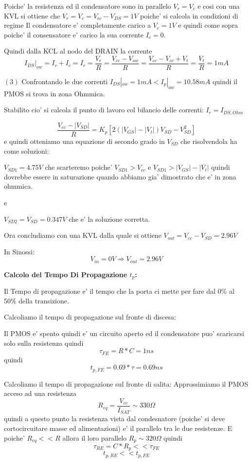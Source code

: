 \documentclass[\main/main.tex]{subfiles}
\begin{document}
Poiche' la resistenza ed il condensatore sono in parallelo $V_r = V_c$ e cosi con una KVL si ottiene che $V_r = V_c = V_{cc} - V_{DS} = 1V$ poiche' si calcola in condizioni di regime Il condensatore e' completamente carico a $V_c = 1V$  e quindi come sopra poiche' il consensatore e' carico la sua corrente $I_c = 0$.

Quindi dalla KCL al nodo del DRAIN la corrente \[I_{DS}|_{ow} = I_r + I_c = I_r = \frac{V_r}{R}= \frac{ V_{cc} - V_{ow}}{R} =  \frac{ V_{cc} - V_{cc} + V_t}{R} = \frac{V_t}{R} = 1mA\]

$(3)$ Confrontando le due correnti $I_{DS}|_{ow} = 1mA < I_p |_{ow} = 10.58mA$ quindi il PMOS si trova in zona Ohmmica.


Stabilito cio' si calcola il punto di lavoro col bilancio delle correnti:
$I_r = I_{DS,Ohm}$

\[\frac{V_{cc} - |V_{SD}|}{R} = K_p \left[ 2 \left(|V_{GS}| - |V_t|\right)V_{SD} - V_{SD}^2 \right]\]
e quindi otteniamo una equazione di secondo grado in $V_{SD}$ che risolvendola ha come soluzioni:

$V_{SD1} = 4.75V$ che scarteremo poiche' $V_{SD1} > V_{cc}$ e $V_{SD1} > |V_{GS}| - |V_t|$ quindi dovrebbe essere in saturazione quando abbiamo gia' dimostrato che e' in zona ohmmica.

e

$V_{SD2} = V_{SD} = 0.347V$ che e' la soluzione corretta.

Ora concludiamo con una KVL dalla quale si ottiene $V_{out} = V_{cc} - V_{SD} = 2.96V$

In Sinossi:
\[V_{in} = 0V \Rightarrow V_{out} = 2.96V\]

\clearpage
\textbf{Calcolo del Tempo Di Propagazione $t_p$:}

Il Tempo di propagazione e' il tempo che la porta ci mette per fare dal 0\% al 50\% della transizione.

Calcoliamo il tempo di propagazione sul fronte di discesa:

Il PMOS e' spento quindi e' un circuito aperto ed il condensatore puo' scaricarsi solo sulla resistenza quindi \[\tau_{FE} = R * C = 1ns\]
quindi \[t_{p,FE} = 0.69 * \tau = 0.69ns\]

Calcoliamo il tempo di propagazione sul fronte di salita:
Approssimiamo il PMOS acceso ad una resistenza
\[R_{eq} = \frac{V_{cc}}{I_{SAT}} \sim 330\Omega\]
quindi a questo punto la resistenza vista dal condesnatore (poiche' si deve cortocircuitare masse ed alimentazioni) e' il parallelo tra le due resistenze.
E poiche' $R_{eq} << R$ allora il loro parallelo $R_p \sim 320\Omega$
quindi \[\tau_{RE} = C * R_p << \tau_{FE}\]
\[t_{p,RE} << t_{p,FE}\]
\end{document}
